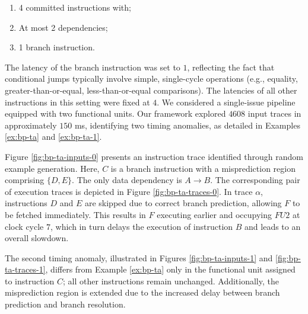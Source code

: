 \begin{enumerate}
    \item 4 committed instructions with;
    \item At most 2 dependencies;
    \item 1 branch instruction.
\end{enumerate}

The latency of the branch instruction was set to $1$, reflecting the fact that conditional jumps typically involve simple, single-cycle operations (e.g., equality, greater-than-or-equal, less-than-or-equal comparisons). The latencies of all other instructions in this setting were fixed at $4$. We considered a single-issue pipeline equipped with two functional units. Our framework explored $4608$ input traces in approximately $150$ ms, identifying two timing anomalies, as detailed in Examples \ref{ex:bp-ta} and \ref{ex:bp-ta-1}.

\begin{example}
Figure \ref{fig:bp-ta-inputs-0} presents an instruction trace identified through random example generation. Here, $C$ is a branch instruction with a misprediction region comprising $\{D, E\}$. The only data dependency is $A \rightarrow B$. The corresponding pair of execution traces is depicted in Figure \ref{fig:bp-ta-traces-0}. In trace $\alpha$, instructions $D$ and $E$ are skipped due to correct branch prediction, allowing $F$ to be fetched immediately. This results in $F$ executing earlier and occupying $FU2$ at clock cycle $7$, which in turn delays the execution of instruction $B$ and leads to an overall slowdown.

\label{ex:bp-ta}
\end{example}

\begin{example}
The second timing anomaly, illustrated in Figures \ref{fig:bp-ta-inputs-1} and \ref{fig:bp-ta-traces-1}, differs from Example \ref{ex:bp-ta} only in the functional unit assigned to instruction $C$; all other instructions remain unchanged. Additionally, the misprediction region is extended due to the increased delay between branch prediction and branch resolution.
\label{ex:bp-ta-1}
\end{example}


